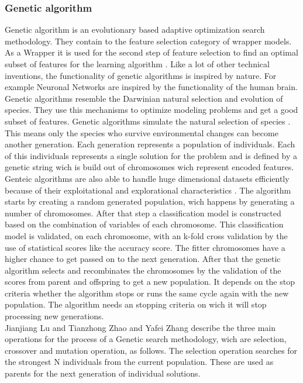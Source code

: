 \documentclass[../masterarbeit.tex]{subfiles}
\begin{document}
\subsubsection{Genetic algorithm}
Genetic algorithm is an evolutionary based adaptive optimization search methodology. They contain to the feature selection category of wrapper models. As a Wrapper it is used for the second step of feature selection to find an optimal subset of features for the learning algorithm \textcite[]{CAI201870}. Like a lot of other technical inventions, the functionality of genetic algorithms is inspired by nature. For example Neuronal Networks are inspired by the functionality of the human brain. Genetic algorithms resemble the Darwinian natural selection and evolution of species. They use this mechanisms to optimize modeling problems and get a good subset of features. Genetic algorithms simulate the natural selection of species \textcite[]{LU2008887} . This means only the species who survive environmental changes can become another generation. Each generation represents a population of individuals. Each of this individuals represents a single solution for the problem and is defined by a genetic string wich is build out of chromosomes wich represent encoded features. \autocite[]{LU2008887} \textcite[]{DBLP:1912}  Genteic algorithms are also able to handle huge dimensional datasets efficiently because of their exploitational and explorational characteristics \textcite[]{LU2008887}. The algorithm starts by creating a random generated population, wich happens by generating a number of chromosomes. After that step a classification model is constructed based on the combination of variables of each chromosome. This classification model is validated, on each chromosome, with an k-fold cross validation by the use of statistical scores like the accuracy score. The fitter chromosomes have a higher chance to get passed on to the next generation. After that the genetic algorithm selects and recombinates the chromosomes by the validation of the scores from parent and offspring to get a new population. It depends on the stop criteria whether the algorithm stops or runs the same cycle again with the new population. The algorithm needs an stopping criteria on wich it will stop processing new generations. \autocite[]{DBLP:1912} \textcite[]{Yang:2018} \textcite[]{LU2008887}\\
Jianjiang Lu and Tianzhong Zhao and Yafei Zhang \textcite[]{LU2008887} describe the three main operations for the process of a Genetic search methodology, wich are selection, crossover and mutation operation, as follows. The selection operation searches for the strongest N individuals from the current population. These are used as parents for the next generation of individual solutions.
\end{document}

